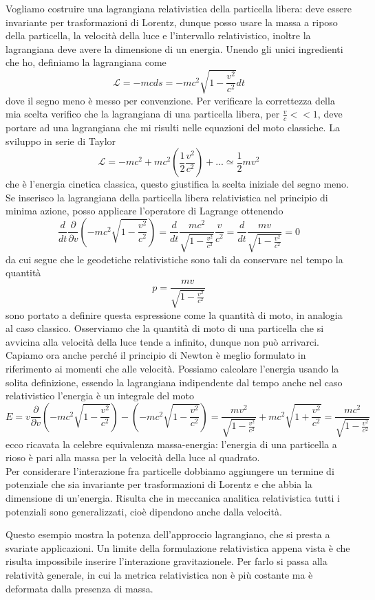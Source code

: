 \documentclass[
10pt, %
a4paper, %
oneside, %
headinclude,footinclude, %
BCOR5mm, %
]{scrartcl}
\begin{document}
Vogliamo costruire una lagrangiana relativistica della particella libera: deve essere invariante per trasformazioni di Lorentz, dunque posso usare la massa a riposo della particella, la velocità della luce e l'intervallo relativistico, inoltre la lagrangiana deve avere la dimensione di un energia. Unendo gli unici ingredienti che ho, definiamo la lagrangiana come
\[\mathcal{L} = -mcds = -mc^2\sqrt{1-\frac{v^2}{c^2}}dt\]
dove il segno meno è messo per convenzione. Per verificare la correttezza della mia scelta verifico che la lagrangiana di una particella libera, per \(\frac{v}{c}<<1\), deve portare ad una lagrangiana che mi risulti nelle equazioni del moto classiche. La sviluppo in serie di Taylor
\[\mathcal{L} = -mc^2 +mc^2\left(\frac{1}{2}\frac{v^2}{c^2}\right)+...\simeq \frac{1}{2}mv^2\]
che è l'energia cinetica classica, questo giustifica la scelta iniziale del segno meno.
Se inserisco la lagrangiana della particella libera relativistica nel principio di minima azione, posso applicare l'operatore di Lagrange ottenendo
\[\frac{d}{dt}\frac{\partial}{\partial v}(-mc^2\sqrt{1-\frac{v^2}{c^2}}) = \frac{d}{dt}\frac{mc^2}{\sqrt{1-\frac{v^2}{c^2}}}\frac{v}{c^2} = \frac{d}{dt}\frac{mv}{\sqrt{1-\frac{v^2}{c^2}}} = 0\]
da cui segue che le geodetiche relativistiche sono tali da conservare nel tempo la quantità 
\[p = \frac{mv}{\sqrt{1-\frac{v^2}{c^2}}}\]
sono portato a definire questa espressione come la quantità di moto, in analogia al caso classico. Osserviamo che la quantità di moto di una particella che si avvicina alla velocità della luce tende a infinito, dunque non può arrivarci. Capiamo ora anche perché il principio di Newton è meglio formulato in riferimento ai momenti che alle velocità. Possiamo calcolare l'energia usando la solita definizione, essendo la lagrangiana indipendente dal tempo anche nel caso relativistico l'energia è un integrale del moto
\[E = v\frac{\partial}{\partial v}(-mc^2\sqrt{1-\frac{v^2}{c^2}})-(-mc^2\sqrt{1-\frac{v^2}{c^2}}) = \frac{mv^2}{\sqrt{1-\frac{v^2}{c^2}}}+mc^2\sqrt{1+\frac{v^2}{c^2}} = \frac{mc^2}{\sqrt{1-\frac{v^2}{c^2}}}\]
ecco ricavata la celebre equivalenza massa-energia: l'energia di una particella a rioso è pari alla massa per la velocità della luce al quadrato.\\
Per considerare l'interazione fra particelle dobbiamo aggiungere un termine di potenziale che sia invariante per trasformazioni di Lorentz e che abbia la dimensione di un'energia. Risulta che in meccanica analitica relativistica tutti i potenziali sono generalizzati, cioè dipendono anche dalla velocità. 
\begin{osservazione}
	Questo esempio mostra la potenza dell'approccio lagrangiano, che si presta a svariate applicazioni. Un limite della formulazione relativistica appena vista è che risulta impossibile inserire l'interazione gravitazionele. Per farlo si passa alla relatività generale, in cui la metrica relativistica non è più costante ma è deformata dalla presenza di massa.
\end{osservazione}
\newpage
\end{document}
